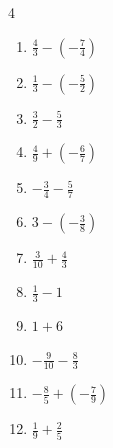 \begin{multicols}{4}
\begin{enumerate}
  \item $\displaystyle \frac{4}{3} - \left(-\frac{7}{4}\right)$


  \item $\displaystyle \frac{1}{3} - \left(-\frac{5}{2}\right)$


  \item $\displaystyle \frac{3}{2} - \frac{5}{3}$


  \item $\displaystyle \frac{4}{9} + \left(-\frac{6}{7}\right)$


  \item $\displaystyle -\frac{3}{4} - \frac{5}{7}$


\columnbreak %

  \item $\displaystyle 3 - \left(-\frac{3}{8}\right)$


  \item $\displaystyle \frac{3}{10} + \frac{4}{3}$


  \item $\displaystyle \frac{1}{3} - 1$


  \item $\displaystyle 1 + 6$

        \phantom{$\displaystyle =7$}

  \item $\displaystyle -\frac{9}{10} - \frac{8}{3}$


  \item $\displaystyle -\frac{8}{5} + \left(-\frac{7}{9}\right)$


  \item $\displaystyle \frac{1}{9} + \frac{2}{5}$


\end{enumerate}
\end{multicols}
